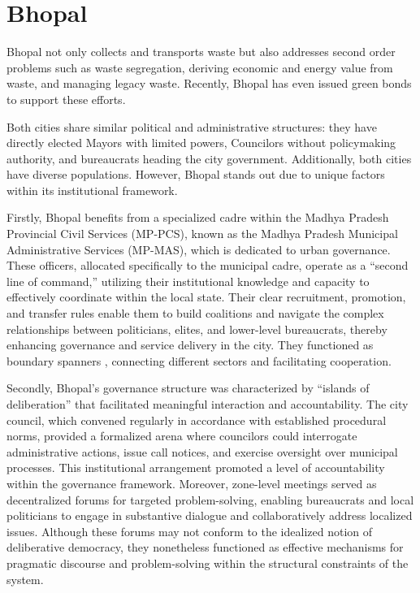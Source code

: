 \section{Bhopal}

Bhopal not only collects and transports waste but also addresses second order problems such as waste segregation, deriving economic and energy value from waste, and managing legacy waste. Recently, Bhopal has even issued green bonds to support these efforts.

Both cities share similar political and administrative structures: they have directly elected Mayors with limited powers, Councilors without policymaking authority, and bureaucrats heading the city government. Additionally, both cities have diverse populations. However, Bhopal stands out due to unique factors within its institutional framework.

Firstly, Bhopal benefits from a specialized cadre within the Madhya Pradesh Provincial Civil Services (MP-PCS), known as the Madhya Pradesh Municipal Administrative Services (MP-MAS), which is dedicated to urban governance. These officers, allocated specifically to the municipal cadre, operate as a ``second line of command,'' utilizing their institutional knowledge and capacity to effectively coordinate within the local state. Their clear recruitment, promotion, and transfer rules enable them to build coalitions and navigate the complex relationships between politicians, elites, and lower-level bureaucrats, thereby enhancing governance and service delivery in the city. They functioned as boundary spanners \citep{Tushman1981}, connecting different sectors and facilitating cooperation.

Secondly, Bhopal's governance structure was characterized by ``islands of deliberation'' that facilitated meaningful interaction and accountability. The city council, which convened regularly in accordance with established procedural norms, provided a formalized arena where councilors could interrogate administrative actions, issue call notices, and exercise oversight over municipal processes. This institutional arrangement promoted a level of accountability within the governance framework. Moreover, zone-level meetings served as decentralized forums for targeted problem-solving, enabling bureaucrats and local politicians to engage in substantive dialogue and collaboratively address localized issues. Although these forums may not conform to the idealized notion of deliberative democracy, they nonetheless functioned as effective mechanisms for pragmatic discourse and problem-solving within the structural constraints of the system.

